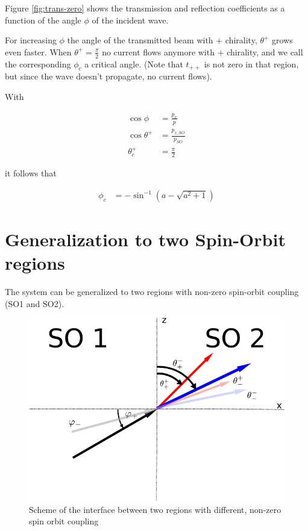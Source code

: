 \documentclass[11pt]{article}
\begin{document}
Figure \ref{fig:trans-zero} shows the transmission and reflection
coefficients as a function of the angle $\phi$ of the incident wave.

For increasing $\phi$ the angle of the transmitted beam with $+$
chirality, $\theta^+$ grows even faster. When $\theta^+ =
\frac{\pi}{2}$ no current flows anymore with $+$ chirality, and we
call the corresponding $\phi_c$ a critical angle. (Note that $t_{++}$
is not zero in that region, but since the wave doesn't propagate, no
current flows).

With

\begin{align}
    \cos \phi       &= \frac{p_x}{p}\\
    \cos \theta^+   &= \frac{p_{x,SO}}{p_{SO}}\\
    \theta_c^+      &= \frac{\pi}{2}
\end{align}

it follows that

\begin{align}
    \phi_c          &= -\sin ^{-1}\left(a-\sqrt{a^2+1}\right)
\end{align}

\clearpage
\section{Generalization to two Spin-Orbit regions}

The system can be generalized to two regions with non-zero spin-orbit
coupling (SO1 and SO2).

\begin{figure}
    \begin{center}
        \includegraphics{setup-two-so-regions.pdf}
    \end{center}
    \caption{Scheme of the interface between two regions with
        different, non-zero spin orbit coupling}
    \label{fig:setup-nonzero}
\end{figure}
\end{document}
